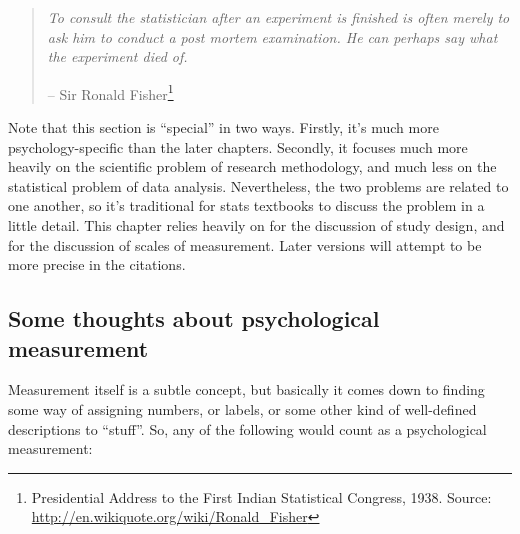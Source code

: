 \documentclass[
]{book}
\begin{document}
\begin{quote}
\emph{To consult the statistician after an experiment is finished is often merely to ask him to conduct a post mortem examination. He can perhaps say what the experiment died of.}

-- Sir Ronald Fisher\footnote{Presidential Address to the First Indian Statistical Congress, 1938. Source: \url{http://en.wikiquote.org/wiki/Ronald_Fisher}}
\end{quote}

Note that this section is ``special'' in two ways. Firstly, it's much more psychology-specific than the later chapters. Secondly, it focuses much more heavily on the scientific problem of research methodology, and much less on the statistical problem of data analysis. Nevertheless, the two problems are related to one another, so it's traditional for stats textbooks to discuss the problem in a little detail. This chapter relies heavily on \citet{Campbell1963} for the discussion of study design, and \citet{Stevens1946} for the discussion of scales of measurement. Later versions will attempt to be more precise in the citations.

\hypertarget{some-thoughts-about-psychological-measurement}{%
\subsection{Some thoughts about psychological measurement}\label{some-thoughts-about-psychological-measurement}}

Measurement itself is a subtle concept, but basically it comes down to finding some way of assigning numbers, or labels, or some other kind of well-defined descriptions to ``stuff''. So, any of the following would count as a psychological measurement:
\end{document}
